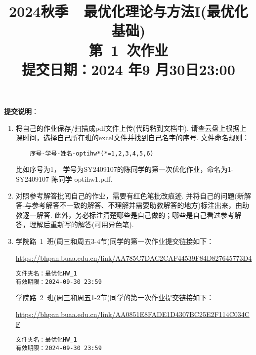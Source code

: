 \documentclass[a4paper,12pt]{ctexart}
\title{2024秋季 \,\, 最优化理论与方法I(最优化基础)\\
第~1~次作业\\
 \small 提交日期：2024 年9 月30日23:00}
\begin{document}
\maketitle

{\bf 提交说明}：
\begin{enumerate}
\item 将自己的作业保存/扫描成pdf文件上传(代码粘到文档中). 请查云盘上根据上课时间，选择自己所在班的excel文件并找到自己名字的序号. 文件命名规则：
\begin{verbatim}
	序号-学号-姓名-optihw*(*=1,2,3,4,5,6)
\end{verbatim}
比如序号为1， 学号为SY2409107的陈同学的第一次优化作业，命名为1-SY2409107-陈同学-optihw1.pdf.
\item 对照参考解答批阅自己的作业，需要有红色笔批改痕迹. 并将自己的问题(新解答-与参考解答不一致的解答、不理解并需要助教解答的地方)标注出来，由助教逐一解答. 此外，务必标注清楚哪些是自己做的；哪些是自己看过参考解答，理解后重新写的解答(可用异色笔).

\item 学院路~1~班(周三和周五3-4节)同学的第一次作业提交链接如下：

\url{https://bhpan.buaa.edu.cn/link/AA785C7DAC2CAF44539F84D827645773D4}
\begin{verbatim}
文件夹名：最优化HW_1
有效期限：2024-09-30 23:59
\end{verbatim}

学院路~2~班(周三和周五1-2节)同学的第一次作业提交链接如下：

\url{https://bhpan.buaa.edu.cn/link/AA0851E8FADE1D4307BC25E2F114C034CF}
\begin{verbatim}
文件夹名：最优化HW_1
有效期限：2024-09-30 23:59
\end{verbatim}
\end{enumerate}
\end{document}
